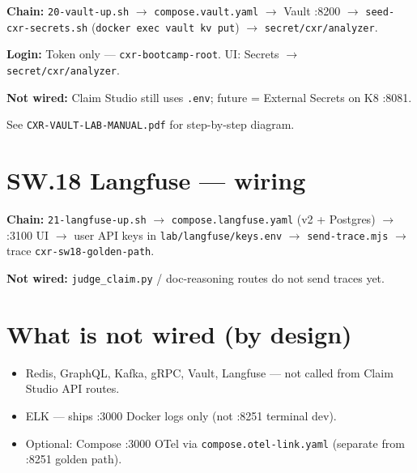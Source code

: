 \documentclass[11pt,a4paper]{report}
\begin{document}
\textbf{Chain:} \texttt{20-vault-up.sh} $\rightarrow$ \texttt{compose.vault.yaml} $\rightarrow$ Vault :8200 $\rightarrow$
\texttt{seed-cxr-secrets.sh} (\texttt{docker exec vault kv put}) $\rightarrow$ \texttt{secret/cxr/analyzer}.

\textbf{Login:} Token only --- \texttt{cxr-bootcamp-root}. UI: Secrets $\rightarrow$ \texttt{secret/cxr/analyzer}.

\textbf{Not wired:} Claim Studio still uses \texttt{.env}; future = External Secrets on K8 :8081.

See \texttt{CXR-VAULT-LAB-MANUAL.pdf} for step-by-step diagram.

\chapter{SW.18 Langfuse --- wiring}

\textbf{Chain:} \texttt{21-langfuse-up.sh} $\rightarrow$ \texttt{compose.langfuse.yaml} (v2 + Postgres) $\rightarrow$ :3100 UI $\rightarrow$
user API keys in \texttt{lab/langfuse/keys.env} $\rightarrow$ \texttt{send-trace.mjs} $\rightarrow$ trace \texttt{cxr-sw18-golden-path}.

\textbf{Not wired:} \texttt{judge\_claim.py} / doc-reasoning routes do not send traces yet.

\chapter{What is not wired (by design)}

\begin{itemize}
  \item Redis, GraphQL, Kafka, gRPC, Vault, Langfuse --- not called from Claim Studio API routes.
  \item ELK --- ships :3000 Docker logs only (not :8251 terminal dev).
  \item Optional: Compose :3000 OTel via \texttt{compose.otel-link.yaml} (separate from :8251 golden path).
\end{itemize}
\end{document}

